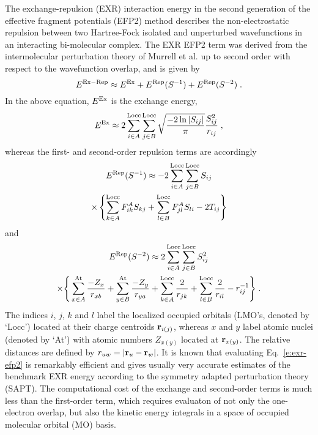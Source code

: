 The exchange\hyp{}repulsion (EXR) interaction energy in the
second generation of the
effective fragment potentials (EFP2) method\cite{Gordon.Smith.Xu.Slipchenko.AnnuRevPhysChem.2013,
   Nguyen.Pachter.Day.JCP.2014,
   Day.Jensen.Gordon.Webb.Stevens.Krauss.Garmer.Basch.Cohen.JCP.1996}
describes the non\hyp{}electrostatic repulsion
between two Hartree\hyp{}Fock\cite{Roothaan.RevModPhys.1951} 
isolated and unperturbed wavefunctions in an interacting
bi\hyp{}molecular complex.
The EXR EFP2 term was derived from the intermolecular perturbation theory
of Murrell et al.\cite{Murrell.Randic.Williams.Longuet-Higgins.ProcRSocLondA.1965,Otto.Ladik.ChemPhys.1975} 
up to second order with respect to the wavefunction overlap,
and is given by~\cite{Jensen.JCP.1996,Jensen.Gordon.MolPhys.1996,Jensen.Gordon.JCP.1998}
%
\begin{equation} \label{e:exr-efp2}
 E^{\rm Ex-Rep} \approx
 E^{\rm Ex} +
 E^{\rm Rep}(S^{-1}) + 
 E^{\rm Rep}(S^{-2}) \;.
\end{equation}
%
In the above equation,
$E^{\rm Ex}$ is the exchange energy,\cite{Jensen.JCP.1996}
%
\begin{equation} \label{e:exc-efp2}
 E^{\rm Ex} \approx 2 \sum_{i\in A}^{\rm Locc} \sum_{j\in B}^{\rm Locc} 
 \sqrt{\frac{-2\ln{\vert S_{ij}\vert}}{\pi}} \frac{S^2_{ij}}{r_{ij}} \;,
\end{equation}
%
whereas the first\hyp{} and second\hyp{}order repulsion terms
are accordingly~\cite{Jensen.Gordon.MolPhys.1996,Jensen.Gordon.JCP.1998}
%
\begin{multline} \label{e:rep-efp2.s1}
 E^{\rm Rep}(S^{-1}) \approx - 2 \sum_{i\in A}^{\rm Locc} \sum_{j\in B}^{\rm Locc} S_{ij} \\
 \times
 \left\{
 \sum_{k\in A}^{\rm Locc} F_{ik}^A S_{kj} 
+\sum_{l\in B}^{\rm Locc} F_{jl}^A S_{li} 
 -2T_{ij}
 \right\}
\end{multline}
%
and 
%
\begin{multline} \label{e:rep-efp2.s2}
 E^{\rm Rep}(S^{-2}) \approx 2 \sum_{i\in A}^{\rm Locc} \sum_{j\in B}^{\rm Locc} S_{ij}^2 
 \\ \times 
 \Bigg\{
 \sum_{x\in A}^{\rm At}  \frac{-Z_x}{r_{xb}}
+\sum_{y\in B}^{\rm At}  \frac{-Z_y}{r_{ya}} 
+\sum_{k\in A}^{\rm Locc} \frac{   2}{r_{jk}}
+\sum_{l\in B}^{\rm Locc} \frac{   2}{r_{il}}
-r_{ij}^{-1}
 \Bigg\} \;.
\end{multline}
%
The indices $i$, $j$, $k$ and $l$ label the localized occupied orbitals (LMO's, denoted by `Locc')
located at their charge centroids ${\bf r}_{i(j)}$,
whereas $x$ and $y$ label atomic nuclei (denoted by `At') with atomic numbers 
$Z_{x(y)}$ located at ${\bf r}_{x(y)}$. The relative distances are
defined by $r_{uw}=\vert {\bf r}_u-{\bf r}_w\vert$.
It is known that evaluating Eq.~\eqref{e:exr-efp2}
is remarkably efficient and gives usually very accurate
estimates of the benchmark EXR energy according to the symmetry 
adapted perturbation theory\cite{Jeziorski.Moszynski.Szalewicz.ChemRev.1994} (SAPT).
The computational cost of
the exchange and second\hyp{}order terms
is much less than the first\hyp{}order term,
which requires evaluaton of not only the one\hyp{}electron overlap,
but also the kinetic
energy integrals in a space of occupied molecular orbital (MO) basis.

